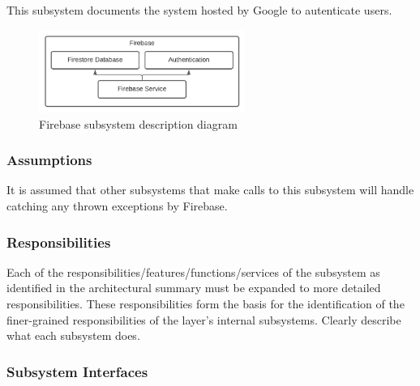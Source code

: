 This subsystem documents the system hosted by Google to autenticate users.


\begin{figure}[h!]
    \centering
    \includegraphics[width=0.60\textwidth]{images/ADS_Diagram_Firebase}
    \caption{Firebase subsystem description diagram}
\end{figure}

\subsubsection{Assumptions}

It is assumed that other subsystems that make calls to this subsystem will handle catching any thrown exceptions by Firebase.

\subsubsection{Responsibilities}
Each of the responsibilities/features/functions/services of the subsystem as identified in the architectural summary must be expanded to more detailed responsibilities. These responsibilities form the basis for the identification of the finer-grained responsibilities of the layer's internal subsystems. Clearly describe what each subsystem does.

\subsubsection{Subsystem Interfaces}

